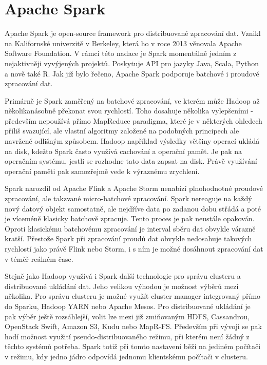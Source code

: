 \documentclass[thesis=B,czech]{FITthesis}[2012/06/26]
\begin{document}
	
	
\section{Apache Spark}
	Apache Spark je open-source framework pro distribuované zpracování dat. Vznikl na Kalifornské univerzitě v Berkeley, která ho v roce 2013 věnovala Apache Software Foundation. V rámci této nadace je Spark momentálně jedním z nejaktivněji vyvýjených projektů\cite{spark-toplevel}. Poskytuje API pro jazyky Java, Scala, Python a nově také R. Jak již bylo řečeno, Apache Spark podporuje batchové i proudové zpracování dat. 
	
	Primárně je Spark zaměřený na batchové zpracování, ve kterém může Hadoop až několikanásobně překonat svou rychlostí. Toho dosahuje několika vylepšeními - především nepoužívá přímo MapReduce paradigma, které je v některých ohledech příliš svazující, ale vlastní algoritmy založené na podobných principech ale navržené odlišným způsobem. Hadoop například výsledky většiny operací ukládá na disk, kdežto Spark často využívá cachování a operační pamět. Je pak na operačním systému, jestli se rozhodne tato data zapsat na disk\cite{spark-mapreduce-difference}. Právě využívání operační paměti pak samozřejmě vede k výraznému zrychlení. 
		
	Spark narozdíl od Apache Flink a Apache Storm nenabízí plnohodnotné proudové zpracování, ale takzvané micro-batchové zpracování. Spark nereaguje na každý nový datový objekt samostatně, ale nejdříve data po zadanou dobu střádá a poté je víceméně klasicky batchově zpracuje. Tento proces je pak neustále opakován. Oproti klasickému batchovému zpracování je interval sběru dat obvykle várazně kratší.  Přestože Spark při zpracování proudů dat obvykle nedosahuje takových rychlostí jako právě Flink nebo Storm, i s ním je možné dosáhnout zpracování dat v téměř reálném čase\cite{streaming-benchmark}. 

	Stejně jako Hadoop využívá i Spark další technologie pro správu clusteru a distribuované ukládání dat. Jeho velikou výhodou je možnost výběrů mezi několika. Pro správu clusteru je možné využít cluster manager integrovaný přímo do Sparku, Hadoop YARN nebo Apache Mesos. Pro distribuované ukládání je pak výběr ještě rozsáhlejší, volit lze mezi již zmiňovaným HDFS, Cassandrou, OpenStack Swift, Amazon S3, Kudu nebo MapR-FS. Především při vývoji se pak hodí možnost využití pseudo-distribuovaného režimu, při kterém není žádný z těchto systémů potřeba. Spark totiž při tomto nastavení běží na jediném počítači v režimu, kdy jedno jádro odpovídá jednomu klientskému počítači v clusteru. 
\end{document}
